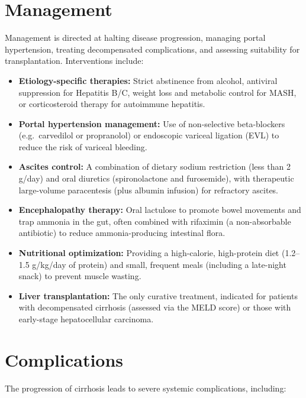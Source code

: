 \section*{Management}
Management is directed at halting disease progression, managing portal hypertension, treating decompensated complications, and assessing suitability for transplantation. Interventions include:

\begin{itemize}
    \item \textbf{Etiology-specific therapies:} Strict abstinence from alcohol, antiviral suppression for Hepatitis B/C, weight loss and metabolic control for MASH, or corticosteroid therapy for autoimmune hepatitis.
    \item \textbf{Portal hypertension management:} Use of non-selective beta-blockers (e.g.\ carvedilol or propranolol) or endoscopic variceal ligation (EVL) to reduce the risk of variceal bleeding.
    \item \textbf{Ascites control:} A combination of dietary sodium restriction (less than 2 g/day) and oral diuretics (spironolactone and furosemide), with therapeutic large-volume paracentesis (plus albumin infusion) for refractory ascites.
    \item \textbf{Encephalopathy therapy:} Oral lactulose to promote bowel movements and trap ammonia in the gut, often combined with rifaximin (a non-absorbable antibiotic) to reduce ammonia-producing intestinal flora.
    \item \textbf{Nutritional optimization:} Providing a high-calorie, high-protein diet (1.2--1.5 g/kg/day of protein) and small, frequent meals (including a late-night snack) to prevent muscle wasting.
    \item \textbf{Liver transplantation:} The only curative treatment, indicated for patients with decompensated cirrhosis (assessed via the MELD score) or those with early-stage hepatocellular carcinoma.
\end{itemize}

\section*{Complications}
The progression of cirrhosis leads to severe systemic complications, including:

